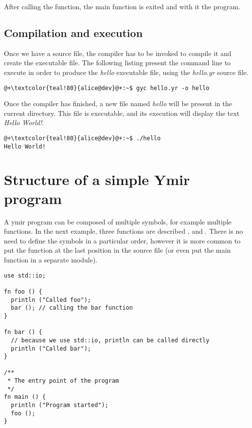 After calling the  function, the main function is exited
and with it the program.

\subsection{Compilation and execution}

Once we have a source file, the compiler has to be invoked to compile it and
create the executable file. The following listing present the command line to
execute in order to produce the \textit{hello} executable file, using the
\textit{hello.yr} source file.

\begin{lstlisting}[style=bashVerb, escapechar=@+]
@+\textcolor{teal!80}{alice@dev}@+:~$ gyc hello.yr -o hello
\end{lstlisting}

Once the compiler has finished, a new file named \textit{hello} will be present
in the current directory. This file is executable, and its execution will
display the text \textit{Hello World!}.

\begin{lstlisting}[style=bashVerb, escapechar=@+]
@+\textcolor{teal!80}{alice@dev}@+:~$ ./hello
Hello World!
\end{lstlisting}

\section{Structure of a simple Ymir program}

A ymir program can be composed of multiple symbols, for example multiple
functions. In the next example, three functions are described ,
 and . There is no need to define the symbols in a
particular order, however it is more common to put the  function at
the last position in the source file (or even put the main function in a
separate module).

\begin{lstlisting}[style=coloredverbatim]
use std::io;

fn foo () {
  println ("Called foo");
  bar (); // calling the bar function
}

fn bar () {
  // because we use std::io, println can be called directly
  println ("Called bar");
}

/**
 * The entry point of the program
 */
fn main () {
  println ("Program started");
  foo ();
}
\end{lstlisting}

